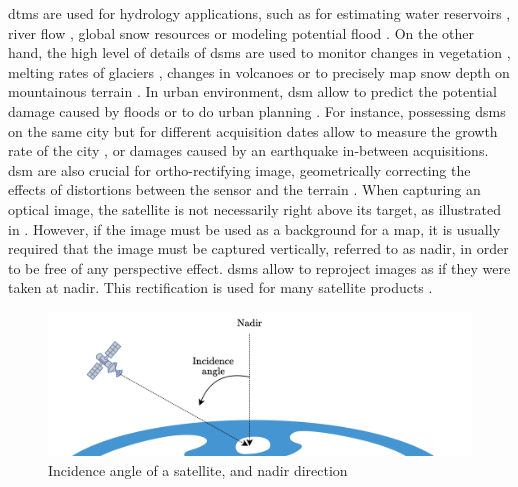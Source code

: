 \acrshort{dtm}s are used for hydrology applications, such as for estimating water reservoirs \cite{yamazaki_merit_2019}, river flow \cite{miguez-macho_incorporating_2007}, global snow resources \cite{gascoin_theia_2019} or modeling potential flood \cite{yamazaki_regional_2014}. On the other hand, the high level of details of \acrshort{dsm}s are used to monitor changes in vegetation \cite{sadeghi_canopy_2016}, melting rates of glaciers \cite{berthier_glacier_2014, rieg_pleiades_2018}, changes in volcanoes \cite{ganci_data_2022} or to precisely map snow depth on mountainous terrain \cite{marti_mapping_2016}. In urban environment, \acrshort{dsm} allow to predict the potential damage caused by floods \cite{jenkins_physics-based_2023} or to do urban planning \cite{velazco_3d_2012}. For instance, possessing \acrshort{dsm}s on the same city but for different acquisition dates allow to measure the growth rate of the city \cite{warth_dsm-based_2019}, or damages caused by an earthquake \cite{erdogan_detection_2019} in-between acquisitions. \acrshort{dsm} are also crucial for ortho-rectifying image, \ie geometrically correcting the effects of distortions between the sensor and the terrain \cite{toutin_ortho-rectification_2012}. When capturing an optical image, the satellite is not necessarily right above its target, as illustrated in . However, if the image must be used as a background for a map, it is usually required that the image must be captured vertically, referred to as nadir, in order to be free of any perspective effect. \acrshort{dsm}s allow to reproject images as if they were taken at nadir. This rectification is used for many satellite products \cite{hagolle_maja_2017}.  
\begin{figure}
    \centering
    \includegraphics[width=0.7\linewidth]{Images/Chap_1/Ortho_Nadir.png}
    \caption{Incidence angle of a satellite, and nadir direction}
    \label{fig:ortho_nadir}
\end{figure}

